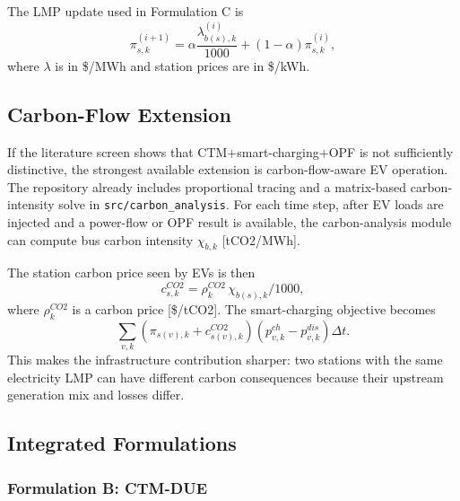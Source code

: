The LMP update used in Formulation C is
\begin{equation}
  \pi^{(i+1)}_{s,k}
  = \alpha\frac{\lambda^{(i)}_{b(s),k}}{1000}
    +(1-\alpha)\pi^{(i)}_{s,k},
  \label{eq:evpt-price-update}
\end{equation}
where \(\lambda\) is in \$/MWh and station prices are in \$/kWh.

\subsection{Carbon-Flow Extension}
\label{sec:evpt-carbon-flow}

If the literature screen shows that CTM+smart-charging+OPF is not sufficiently
distinctive, the strongest available extension is carbon-flow-aware EV
operation. The repository already includes proportional tracing and a
matrix-based carbon-intensity solve in \texttt{src/carbon\_analysis}. For each
time step, after EV loads are injected and a power-flow or OPF result is
available, the carbon-analysis module can compute bus carbon intensity
\(\chi_{b,k}\) [tCO2/MWh].

The station carbon price seen by EVs is then
\begin{equation}
  c^{CO2}_{s,k}=\rho^{CO2}_{k}\,\chi_{b(s),k}/1000,
  \label{eq:evpt-carbon-price}
\end{equation}
where \(\rho^{CO2}_k\) is a carbon price [\$/tCO2]. The smart-charging
objective becomes
\begin{equation}
  \sum_{v,k}\left(\pi_{s(v),k}+c^{CO2}_{s(v),k}\right)
       \left(p^{ch}_{v,k}-p^{dis}_{v,k}\right)\Delta t.
  \label{eq:evpt-carbon-aware-charge}
\end{equation}
This makes the infrastructure contribution sharper: two stations with the same
electricity LMP can have different carbon consequences because their upstream
generation mix and losses differ.

\subsection{Integrated Formulations}
\label{sec:evpt-formulations}

\subsubsection{Formulation B: CTM-DUE}
\label{sec:evpt-ctm-due}

